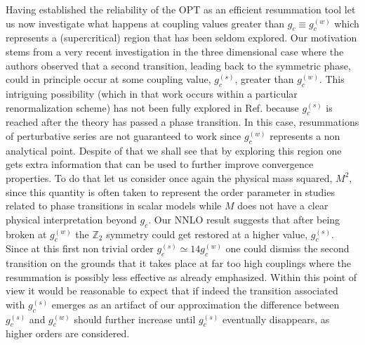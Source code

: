 \documentclass[a4paper,11pt]{article}
\begin{document}
Having established the reliability of the OPT as an efficient resummation tool let us  now investigate what happens at coupling values greater than $g_c\equiv g_c^{(w)}$ which represents a (supercritical) region that has been seldom explored. Our motivation stems from a  very recent investigation \cite{serone4} in the three dimensional case where the authors observed that a second transition, leading back to the symmetric phase, could in principle occur at some coupling value, $g_c^{(s)}$, greater than $g_c^{(w)}$. This intriguing possibility (which in that work occurs within a particular renormalization scheme) has not been fully explored in Ref. \cite {serone4} because $g_c^{(s)}$ is reached after the theory has passed a phase transition. In this case, resummations of perturbative series  are not guaranteed to work since $g_c^{(w)}$ represents a non analytical point. Despite of that we shall see that by exploring this region  one gets  extra information that can be used to further improve convergence properties. To do that let us  consider once again the physical mass squared, $M^2$, since this quantity is often taken to represent  the order parameter in studies related to phase transitions in scalar models \cite {OPTphi4} while  $M$ does not have a clear physical interpretation  beyond $g_c$. Our NNLO result suggests that  after being broken at  $g_c^{(w)}$   the  $\mathbb{Z}_2$ symmetry could get restored at a higher value, $g_c^{(s)}$. Since at this first non trivial  order $g_c^{(s)} \simeq 14 g_c^{(w)}$ one could  dismiss the second transition on the grounds that it takes place at far too high couplings where the resummation is possibly  less effective as already emphasized. Within this point of view it would be reasonable to  expect that if indeed the  transition associated with $g_c^{(s)}$  emerges as an artifact of our approximation  the difference between $g_c^{(s)}$ and $g_c^{(w)}$ should further increase until $g_c^{(s)}$ eventually disappears, as higher orders are considered. 
\end{document}
